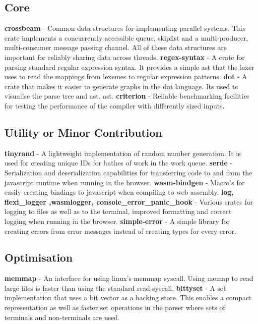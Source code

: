 \subsection{Core}

\textbf{crossbeam} - Common data structures for implementing parallel systems.
This crate implements a concurrently accessible queue, skiplist and a
multi-producer, multi-consumer message passing channel. All of these data
structures are important for reliably sharing data across threads.
\newline\newline
\textbf{regex-syntax} - A crate for parsing standard regular expression syntax.
It provides a simple \gls{ast} that the lexer uses to read the mappings from
lexemes to regular expression patterns.
\newline\newline
\textbf{dot} - A crate that makes it easier to generate graphs in the dot
language. Its used to visualise the parse tree and \gls{ast}.
\gls{ast}.
\newline\newline
\textbf{criterion} - Reliable benchmarking facilities for testing the performance of the
compiler with differently sized inputs.

\subsection{Utility or Minor Contribution}
\textbf{tinyrand} - A lightweight implementation of random number
generation. It is used for creating unique IDs for bathes of work in the work
queue.
\textbf{serde} - Serialization and deserialization capabilities for transferring
code to and from the javascript runtime when running in the browser.
\newline\newline
\textbf{wasm-bindgen} - Macro's for easily creating bindings to javascript when
compiling to web assembly.
\newline\newline
\textbf{log, flexi\_logger ,wasm\-logger, console\_error\_panic\_hook} - Various
crates for logging to files as well as to the terminal, improved formatting and
correct logging when running in the browser.
\newline\newline
\textbf{simple-error} - A simple library for creating errors from error messages
instead of creating types for every error.

\subsection{Optimisation}
\textbf{memmap} - An interface for using linux's memmap syscall. Using memap to
read large files is  faster than using the standard read syscall.
\newline\newline
\textbf{bittyset} - A set implementation that uses a bit vector as a backing
store. This enables a compact representation as well as faster set operations in
the parser where sets of terminals and non-terminals are used.


